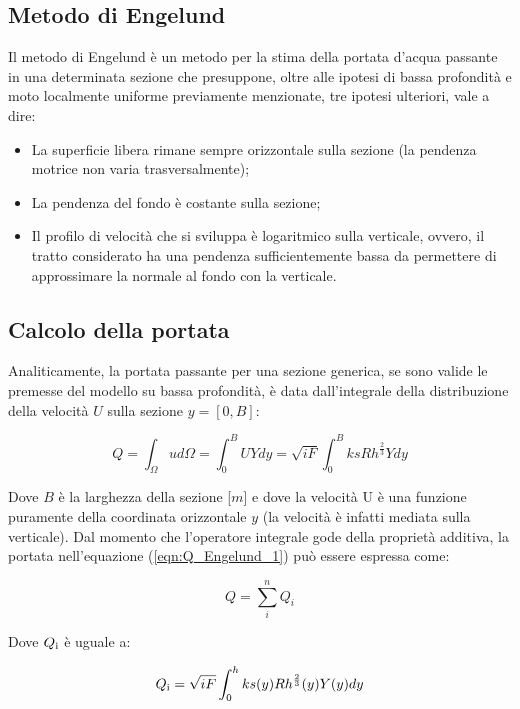 \documentclass[12pt]{article} %
\begin{document}
\subsection{Metodo di Engelund}
\noindent Il metodo di Engelund è un metodo per la stima della portata d’acqua passante in una determinata sezione che presuppone, oltre alle ipotesi di bassa profondità e moto localmente uniforme previamente menzionate, tre ipotesi ulteriori, vale a dire:
\begin{itemize}
    \item La superficie libera rimane sempre orizzontale sulla sezione (la pendenza motrice non varia trasversalmente);
    \item La pendenza del fondo è costante sulla sezione;
    \item Il profilo di velocità che si sviluppa è logaritmico sulla verticale, ovvero, il tratto considerato ha una pendenza sufficientemente bassa da permettere di approssimare la normale al fondo con la verticale.
\end{itemize}

\subsection{Calcolo della portata}
\noindent Analiticamente, la portata passante per una sezione generica, se sono valide le premesse del modello su bassa profondità, è data dall’integrale della distribuzione della velocità $U$ sulla sezione $y = [0, B]$:

\begin{equation}
    Q=\int_{\Omega}^{} ud\Omega=\int_{0}^{B}UYdy=\sqrt{iF}\int_{0}^{B}ksRh^{\frac{2}{3}}Ydy
    \label{eqn:Q_Engelund_1}
\end{equation}

\noindent Dove $B$ è la larghezza della sezione [$m$] e dove la velocità U è una funzione puramente della coordinata orizzontale $y$ (la velocità è infatti mediata sulla verticale).
Dal momento che l’operatore integrale gode della proprietà additiva, la portata nell’equazione (\ref{eqn:Q_Engelund_1}) può essere espressa come:

\begin{equation}
    Q=\sum_i^n Q_i
    \label{eqn:Q_Engelund_2}
\end{equation}

\noindent Dove $Q\textsubscript{i}$ è uguale a:

\begin{equation}
    Q\textsubscript{i}=\sqrt{iF}\int_{0}^{h} ks(y)Rh^{\frac{2}{3}}(y)Y(y)dy
    \label{eqn:Q_Engelund_3}
\end{equation}
\end{document}
